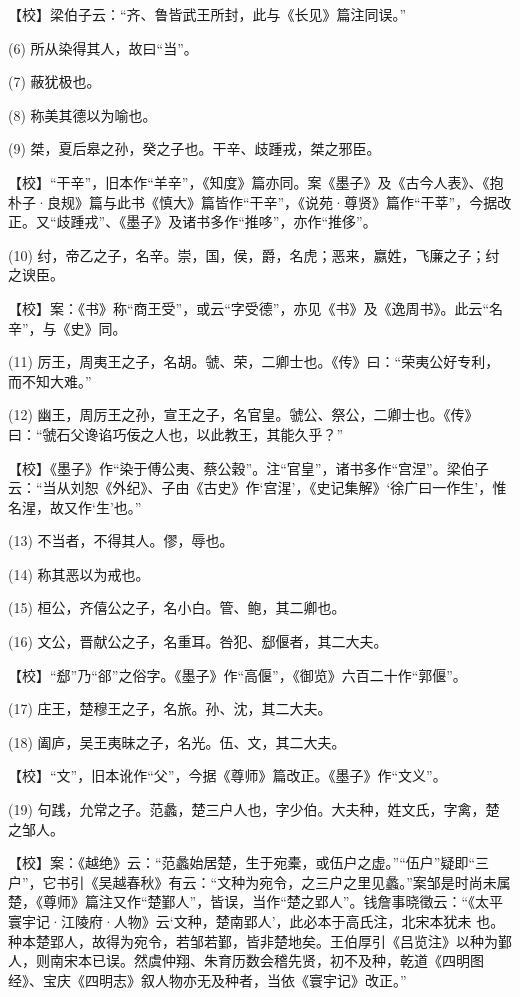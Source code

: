 \documentclass[12pt,UTF8]{ctexbook}
\begin{document}
【校】梁伯子云：“齐、鲁皆武王所封，此与《长见》篇注同误。”

(6) 所从染得其人，故曰“当”。

(7) 蔽犹极也。

(8) 称美其德以为喻也。

(9) 桀，夏后皋之孙，癸之子也。干辛、歧踵戎，桀之邪臣。

【校】“干辛”，旧本作“羊辛”，《知度》篇亦同。案《墨子》及《古今人表》、《抱朴子·良规》篇与此书《慎大》篇皆作“干辛”，《说苑·尊贤》篇作“干莘”，今据改正。又“歧踵戎”、《墨子》及诸书多作“推哆”，亦作“推侈”。

(10) 纣，帝乙之子，名辛。崇，国，侯，爵，名虎；恶来，嬴姓，飞廉之子；纣之谀臣。

【校】案：《书》称“商王受”，或云“字受德”，亦见《书》及《逸周书》。此云“名辛”，与《史》同。

(11) 厉王，周夷王之子，名胡。虢、荣，二卿士也。《传》曰：“荣夷公好专利，而不知大难。”

(12) 幽王，周厉王之孙，宣王之子，名官皇。虢公、祭公，二卿士也。《传》曰：“虢石父谗谄巧佞之人也，以此教王，其能久乎？”

【校】《墨子》作“染于傅公夷、蔡公穀”。注“官皇”，诸书多作“宫涅”。梁伯子云：“当从刘恕《外纪》、子由《古史》作‘宫湦’，《史记集解》‘徐广曰一作生’，惟名湦，故又作‘生’也。”

(13) 不当者，不得其人。僇，辱也。

(14) 称其恶以为戒也。

(15) 桓公，齐僖公之子，名小白。管、鲍，其二卿也。

(16) 文公，晋献公之子，名重耳。咎犯、郄偃者，其二大夫。

【校】“郄”乃“郤”之俗字。《墨子》作“高偃”，《御览》六百二十作“郭偃”。

(17) 庄王，楚穆王之子，名旅。孙、沈，其二大夫。

(18) 阖庐，吴王夷昧之子，名光。伍、文，其二大夫。

【校】“文”，旧本讹作“父”，今据《尊师》篇改正。《墨子》作“文义”。

(19) 句践，允常之子。范蠡，楚三户人也，字少伯。大夫种，姓文氏，字禽，楚之邹人。

【校】案：《越绝》云：“范蠡始居楚，生于宛橐，或伍户之虚。”“伍户”疑即“三户”，它书引《吴越春秋》有云：“文种为宛令，之三户之里见蠡。”案邹是时尚未属楚，《尊师》篇注又作“楚鄞人”，皆误，当作“楚之郢人”。钱詹事晓徵云：“《太平寰宇记·江陵府·人物》云‘文种，楚南郢人’，此必本于高氏注，北宋本犹未 也。种本楚郢人，故得为宛令，若邹若鄞，皆非楚地矣。王伯厚引《吕览注》以种为鄞人，则南宋本已误。然虞仲翔、朱育历数会稽先贤，初不及种，乾道《四明图经》、宝庆《四明志》叙人物亦无及种者，当依《寰宇记》改正。”
\end{document}
